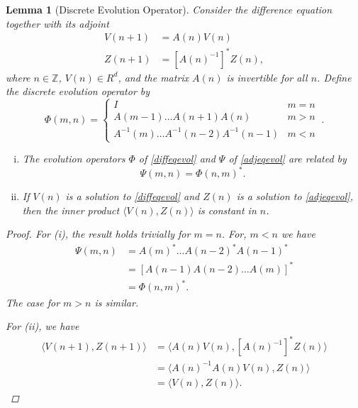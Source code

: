 \documentclass[12pt]{elsarticle}
\def\Z{{\mathbb Z}}
\newtheorem{lemma}{Lemma}
\begin{document}
\begin{lemma}[Discrete Evolution Operator]\label{evolop}
Consider the difference equation together with its adjoint
\begin{align}
V(n+1) &= A(n) V(n) \label{diffeqevol} \\
Z(n+1) &= [A(n)^{-1}]^* Z(n) , \label{adjeqevol}
\end{align}
where $n \in \Z$, $V(n) \in R^d$, and the matrix $A(n)$ is invertible for all $n$. Define the discrete evolution operator by
\begin{equation}\label{evol}
\Phi(m, n) = 
\begin{cases}
I & m = n \\
A(m-1) \dots A(n+1) A(n) & m > n \\
A^{-1}(m) \dots A^{-1}(n-2) A^{-1}(n-1) & m < n
\end{cases} \:.
\end{equation}
\begin{enumerate}[(i)]
\item The evolution operators $\Phi$ of \cref{diffeqevol} and $\Psi$ of \cref{adjeqevol} are related by
\begin{equation}\label{adjevol}
\Psi(m, n) = \Phi(n, m)^*.
\end{equation}
\item If $V(n)$ is a solution to \cref{diffeqevol} and $Z(n)$ is a solution to \cref{adjeqevol}, then the inner product $\langle V(n), Z(n) \rangle$ is constant in $n$.
\end{enumerate}

\begin{proof}
For (i), the result holds trivially for $m = n$. For, $m < n$ we have
\begin{align*}
\Psi(m, n) &= A(m)^* \dots A(n-2)^* A(n-1)^* \\
&= [A(n-1) A(n-2) \dots A(m)]^* \\
&= \Phi(n, m)^* .
\end{align*}
The case for $m > n$ is similar.

For (ii), we have
\begin{align*}
\langle V(n+1), Z(n+1) \rangle &= 
\langle A(n) V(n), [A(n)^{-1}]^* Z(n) \rangle \\
&= \langle A(n)^{-1} A(n) V(n), Z(n) \rangle \\
&= \langle V(n), Z(n) \rangle .
\end{align*}
\end{proof}
\end{lemma}
\end{document}
